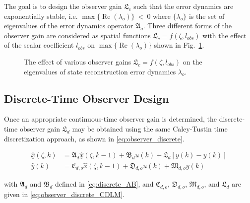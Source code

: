 The goal is to design the observer gain $\mathfrak{L}_c$ such that the error dynamics are exponentially stable, i.e. $\max\{\operatorname{Re}(\lambda_{o})\}~<~0$ where $\{\lambda_{o}\}$ is the set of eigenvalues of the error dynamics operator $\mathfrak{A}_o$. Three different forms of the observer gain are considered as spatial functions $\mathfrak{L}_c = f(\zeta, l_{obs})$ with the effect of the scalar coefficient $l_{obs}$ on $\max\{\operatorname{Re}(\lambda_{o})\}$ shown in Fig.~\ref{fig:L_vs_lambda}.

\begin{figure}[!htbp]
    \centering
    
    \caption{The effect of various observer gains $\mathfrak{L}_c = f(\zeta, l_{obs})$ on the eigenvalues of state reconstruction error dynamics $\lambda_o$.}
    \label{fig:L_vs_lambda}
\end{figure}

\subsection{Discrete-Time Observer Design}

Once an appropriate continuous-time observer gain is determined, the discrete-time observer gain $\mathfrak{L}_d$ may be obtained using the same Caley-Tustin time discretization approach, as shown in \eqref{eq:observer_discrete}.

\begin{equation} \label{eq:observer_discrete}
    \begin{aligned}
        \underline{\hat{x}}(\zeta, k) &= \mathfrak{A}_d \underline{\hat{x}}(\zeta, k-1) + \mathfrak{B}_d u(k) + \mathfrak{L}_d [y(k) - \hat{y}(k)] \\
        \hat{y}(k) &= \mathfrak{C}_{d,o} \underline{\hat{x}}(\zeta, k-1) + \mathfrak{D}_{d,o} u(k) + \mathfrak{M}_{d,o} y(k)
    \end{aligned}
\end{equation}

with $\mathfrak{A}_d$ and $\mathfrak{B}_d$ defined in \eqref{eq:discrete_AB}, and $\mathfrak{C}_{d,o}$, $\mathfrak{D}_{d,o}$, $\mathfrak{M}_{d,o}$, and $\mathfrak{L}_d$ are given in \eqref{eq:observer_discrete_CDLM}.

